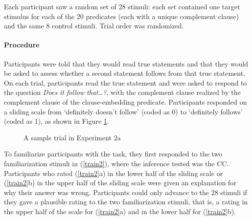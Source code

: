 \documentclass[11pt,fleqn]{article}
\newcommand{\6}{\mbox{$[\hspace*{-.6mm}[$}}
\newcommand{\9}{\mbox{$]\hspace*{-.6mm}]$}}
\begin{document}
Each participant saw a random set of 28 stimuli: each set contained one target stimulus for each of the 20 predicates (each with a unique complement clause) and the same 8 control stimuli. Trial order was randomized.

\paragraph{Procedure} Participants were told that they would read true statements and that they would be asked to assess whether a second statement follows from that true statement. On each trial, participants read the true statement and were asked to respond to the question {\em Does it follow that\ldots?}, with the complement clause realized by the complement clause of the clause-embedding predicate. Participants responded on a sliding scale from `definitely doesn't follow' (coded as 0) to `definitely follows' (coded as 1), as shown in Figure \ref{f-trial-exp3}.

\begin{figure}[H]
\begin{center}
\end{center}
\caption{A sample trial in Experiment 2a}\label{f-trial-exp3}
\end{figure}

To familiarize participants with the task, they first responded to the two familiarization stimuli in (\ref{train2}), where the inference tested was the CC. Participants who rated (\ref{train2}a) in the lower half of the sliding scale or (\ref{train2}b) in the upper half of the sliding scale were given an explanation for why their answer was wrong. Participants could only advance to the 28 stimuli if they gave a plausible rating to the two familiarization stimuli, that is, a rating in the upper half of the scale for (\ref{train2}a) and in the lower half for (\ref{train2}b).
\end{document}
